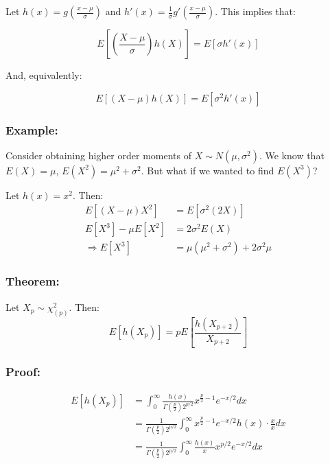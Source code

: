 \documentclass{article}
\begin{document}
Let $h(x) = g\left(\frac{x-\mu}{\sigma} \right)$ and $h'(x) = \frac{1}{\sigma} g'\left(\frac{x-\mu}{\sigma} \right)$. This implies that:

\begin{equation*}
    E\left[\left(\frac{X-\mu}{\sigma}\right) h(X) \right] = E\left[\sigma h'(x) \right]
\end{equation*}

And, equivalently:

\begin{equation*}
    E\left[(X-\mu) h(X) \right] = E\left[\sigma^2 h'(x) \right]
\end{equation*}

\subsubsection*{Example:}

Consider obtaining higher order moments of $X \sim N(\mu,\sigma^2)$. We know that $E(X) = \mu$, $E(X^2) = \mu^2 + \sigma^2$. But what if we wanted to find $E(X^3)$?

Let $h(x) = x^2$. Then:
\begin{equation*}
    \begin{split}
        E[(X-\mu)X^2] &= E[\sigma^2(2X)]\\
        E[X^3] - \mu E[X^2] &= 2\sigma^2E(X)\\
        \Rightarrow E[X^3] &= \mu(\mu^2 + \sigma^2) + 2\sigma^2 \mu
    \end{split}
\end{equation*}

\subsubsection*{Theorem:}
Let $X_p \sim \chi_{(p)}^2$. Then:
\begin{equation*}
    E[h(X_p)] = p E \left[ \frac{h(X_{p+2})}{X_{p+2}} \right]
\end{equation*}

\subsubsection*{Proof:}

\begin{equation*}
    \begin{split}
        E[h(X_p)] &= \int_0^\infty \frac{h(x)}{\Gamma\left(\frac{p}{2} \right) 2^{p/2}} x^{\frac{p}{2}-1} e^{-x/2} dx\\
        &= \frac{1}{\Gamma\left(\frac{p}{2}\right) 2^{p/2}} \int_0^\infty x^{\frac{p}{2}-1} e^{-x/2} h(x) \cdot \frac{x}{x} dx\\
        &= \frac{1}{\Gamma\left(\frac{p}{2}\right) 2^{p/2}} \int_0^\infty \frac{h(x)}{x} x^{p/2} e^{-x/2}  dx
    \end{split}
\end{equation*}
\end{document}
